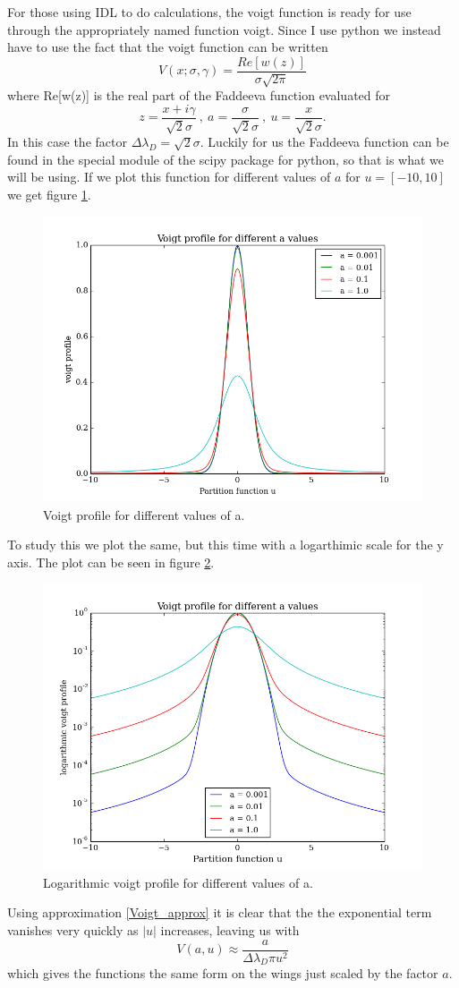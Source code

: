 \documentclass{aa}   %
\begin{document}
For those using IDL to do calculations, the voigt function is ready for use through the appropriately named function voigt.
Since I use python we instead have to use the fact that the voigt function can be written
\begin{equation}
 V(x;\sigma,\gamma) = \frac{Re[w(z)]}{\sigma \sqrt{2\pi}}
\end{equation}
where Re[w(z)] is the real part of the Faddeeva function evaluated for 
\[
 z = \frac{x + i\gamma}{\sqrt{2}\sigma} ~,~ a = \frac{\sigma}{\sqrt{2}\sigma} ~,~ u = \frac{x}{\sqrt{2}\sigma}.
\]
In this case the factor $\Delta\lambda_D = \sqrt{2}\sigma$.
Luckily for us the Faddeeva function can be found in the special module of the scipy package for python, so that is what we will be using. If we plot this function for different values of $a$ for $u = [-10, 10]$ we get figure \ref{voigt_orig}.
\begin{figure}
\includegraphics[width=.49\textwidth]{voigt_original.png}
\caption{Voigt profile for different values of a.}
\label{voigt_orig}
\end{figure}
To study this we plot the same, but this time with a logarthimic scale for the y axis. The plot can be seen in figure \ref{voigt_ylog}.
\begin{figure}
\includegraphics[width=.49\textwidth]{voigt_ylog.png}
\caption{Logarithmic voigt profile for different values of a.}
\label{voigt_ylog}
\end{figure}
Using approximation \ref{Voigt_approx} it is clear that the the exponential term vanishes very quickly as $|u|$ increases, leaving us with
\[
 V(a,u) \approx \frac{a}{\Delta\lambda_D\pi u^2} 
\]
which gives the functions the same form on the wings just scaled by the factor $a$.
\end{document}
